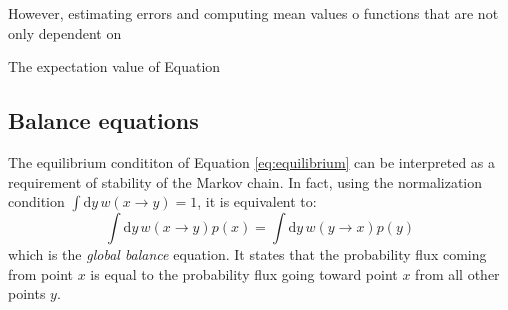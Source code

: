 However, estimating errors and computing mean values o functions that are not only dependent on 


The expectation value of Equation

\subsection*{Balance equations}
The equilibrium condititon of Equation \eqref{eq:equilibrium}
can be interpreted as a requirement of stability of the Markov chain.
In fact, using the normalization condition $\int\mathrm dy\,w(x \to y) = 1$,
it is equivalent to:
\[
	\int\mathrm dy\,w(x \to y)p(x) = \int\mathrm dy\,w(y \to x)p(y)
\]
which is the \emph{global balance} equation.
It states that the probability flux coming from point $x$
is equal to the probability flux going toward point $x$ from all other points $y$.









